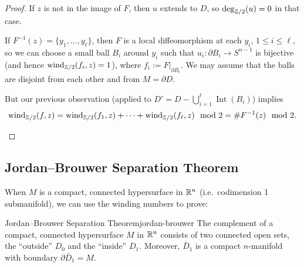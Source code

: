 \begin{proof}
    If $z$ is not in the image of $F$, then $u$ extends to $D$, so $\deg_{\mathbb{Z}/2}(u) = 0$ in that case.

    If $F^{-1}(z) = \{y_1, \ldots, y_\ell\}$, then $F$ is a local diffeomorphism at each $y_i$, $1 \leq i \leq \ell$, so we can choose a small ball $B_i$ around $y_i$ such that $u_i \colon \partial B_i \to S^{n-1}$ is bijective (and hence $\operatorname{wind}_{\mathbb{Z}/2}(f_i, z) = 1$), where $f_i := F|_{\partial B_i}$. We may assume that the balls are disjoint from each other and from $M = \partial D$.

    But our previous observation (applied to $D' = D - \bigcup_{i=1}^{\ell} \operatorname{Int}(B_i)$) implies
    \[
        \operatorname{wind}_{\mathbb{Z}/2}(f, z) = \operatorname{wind}_{\mathbb{Z}/2}(f_1, z) + \cdots + \operatorname{wind}_{\mathbb{Z}/2}(f_\ell, z) \mod 2 = \# F^{-1}(z) \mod 2.
    \]
    \begin{center}
    \end{center}
\end{proof}

\subsection{Jordan--Brouwer Separation Theorem}

When $M$ is a compact, connected hypersurface in $\mathbb{R}^n$ (i.e.\ codimension 1 submanifold), we can use the winding numbers to prove:

\begin{theorem}{Jordan--Brouwer Separation Theorem}{jordan-brouwer}
    The complement of a compact, connected hypersurface $M$ in $\mathbb{R}^n$ consists of two connected open sets, the ``outside'' $D_0$ and the ``inside'' $D_1$. Moreover, $\bar{D}_1$ is a compact $n$-manifold with boundary $\partial \bar{D}_1 = M$.
\end{theorem}

